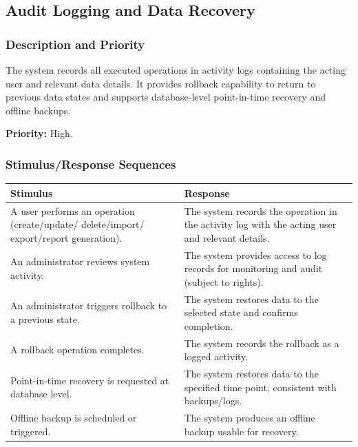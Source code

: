 \documentclass[11pt, a4paper]{article}
\begin{document}
\subsection{Audit Logging and Data Recovery}

\subsubsection{Description and Priority}
The system records all executed operations in activity logs containing the acting user and relevant data details. It provides rollback capability to return to previous data states and supports database-level point-in-time recovery and offline backups.

\textbf{Priority:} High.

\subsubsection{Stimulus/Response Sequences}
\begin{table}[H]
\begin{tabularx}{\textwidth}{>{\raggedright\arraybackslash}p{3.2cm} >{\raggedright\arraybackslash}X}
\toprule
\textbf{Stimulus} & \textbf{Response} \\
\midrule
A user performs an operation (create/update/ delete/import/ export/report generation). & The system records the operation in the activity log with the acting user and relevant details. \\
\midrule
An administrator reviews system activity. & The system provides access to log records for monitoring and audit (subject to rights). \\
\midrule
An administrator triggers rollback to a previous state. & The system restores data to the selected state and confirms completion. \\
\midrule
A rollback operation completes. & The system records the rollback as a logged activity. \\
\midrule
Point-in-time recovery is requested at database level. & The system restores data to the specified time point, consistent with backups/logs. \\
\midrule
Offline backup is scheduled or triggered. & The system produces an offline backup usable for recovery. \\
\bottomrule
\end{tabularx}
\end{table}
\end{document}
